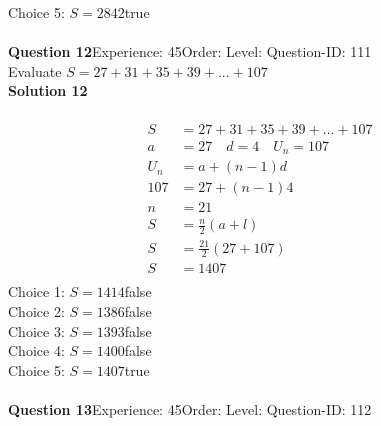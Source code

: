 \documentclass{article}
\begin{document}
Choice 5: \hspace{20pt}$S=2842$\hspace{20pt}true\\
\\[4pt]
\noindent\textbf{Question 12}\hspace{20pt}Experience: 45\hspace{20pt}Order: \hspace{20pt}Level: \hspace{20pt}Question-ID: 111\\[2pt]
Evaluate $S=27+31+35+39+...+107$\\[4pt]
\noindent\textbf{Solution 12}\\[2pt]
\\[-35pt]\begin{align*}
S&=27+31+35+39+...+107\\[2pt]
a&=27\quad d=4 \quad U_n=107\\[2pt]
U_n&=a+(n-1)d\\[2pt]
107&=27+(n-1)4\\[2pt]
n&=21\\[12pt]
S&=\displaystyle\frac{n}{2}(a+l)\\[2pt]
S&=\displaystyle\frac{21}{2}(27+107)\\[2pt]
S&=1407\\[-140pt]
\end{align*}
Choice 1: \hspace{20pt}$S=1414$\hspace{20pt}false\\
Choice 2: \hspace{20pt}$S=1386$\hspace{20pt}false\\
Choice 3: \hspace{20pt}$S=1393$\hspace{20pt}false\\
Choice 4: \hspace{20pt}$S=1400$\hspace{20pt}false\\
Choice 5: \hspace{20pt}$S=1407$\hspace{20pt}true\\
\\[4pt]
\noindent\textbf{Question 13}\hspace{20pt}Experience: 45\hspace{20pt}Order: \hspace{20pt}Level: \hspace{20pt}Question-ID: 112\\[2pt]
\end{document}
